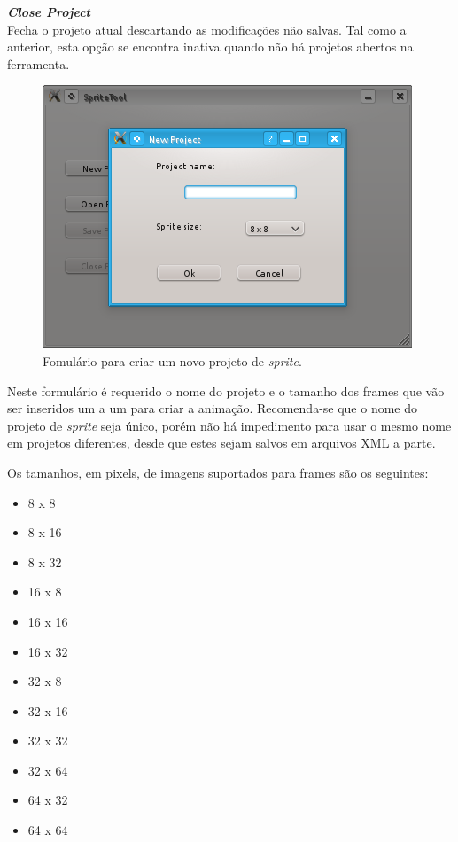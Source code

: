 \documentclass[brazil]{abnt}
\begin{document}
\textbf{\textit{Close Project}}\\
Fecha o projeto atual descartando as modificações não salvas. Tal como a anterior, esta opção se encontra inativa quando não há projetos abertos na ferramenta.

\begin{figure}[H]
\centering
\includegraphics{imgs/spritetool2.png}
\caption{Fomulário para criar um novo projeto de \textit{sprite}.}
\end{figure}

Neste formulário é requerido o nome do projeto e o tamanho dos frames que vão ser inseridos um a um para criar a animação. Recomenda-se que o nome do projeto de \textit{sprite} seja único, porém não há impedimento para usar o mesmo nome em projetos diferentes, desde que estes sejam salvos em arquivos XML a parte.

Os tamanhos, em pixels, de imagens suportados para frames são os seguintes:
\begin{itemize}
\item 8 x 8
\item 8 x 16
\item 8 x 32
\item 16 x 8
\item 16 x 16
\item 16 x 32
\item 32 x 8
\item 32 x 16
\item 32 x 32
\item 32 x 64
\item 64 x 32
\item 64 x 64
\end{itemize}
\end{document}
